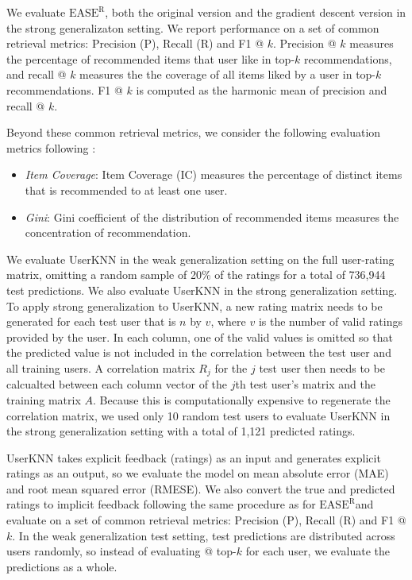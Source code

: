 \documentclass{article}
\newcommand{\easer}{$\text{EASE}^\text{R}$}
\newcommand{\userknn}{UserKNN\xspace}
\begin{document}
  We evaluate \easer, both the original version and the gradient descent version
 in the strong generalizaton setting.
We report performance on a set of common retrieval metrics: Precision (P), Recall
 (R) and F1 @ $k$.
Precision @ $k$ measures the percentage of recommended items that user like in
 top-$k$ recommendations, and recall @ $k$ measures the the coverage of all
 items liked by a user in top-$k$ recommendations.
F1 @ $k$ is computed as the harmonic mean of precision and recall @ $k$.

Beyond these common retrieval metrics, we consider the following evaluation
 metrics following \citet{anelliTopNRecommendationAlgorithms2022}:
 \begin{itemize} \item {\em Item Coverage}: Item Coverage (IC) measures the
 percentage of distinct items that is recommended to at least one user.
\item {\em Gini}: Gini coefficient of the distribution of recommended items
measures the concentration of recommendation.

\end{itemize}

We evaluate \userknn in the weak generalization setting on the full user-rating matrix, 
omitting a random sample of 20\% of the ratings for a total of 736,944 test predictions.  
We also evaluate \userknn in the strong generalization setting. To apply strong 
generalization to \userknn, a new rating matrix needs to be generated for each test user that is $n$ by $v$, where $v$ is 
the number of valid ratings provided by the user. In each column, one of the valid values 
 is omitted so that the predicted value is not included in the correlation between
the test user and all training users. A correlation matrix $R_j$ for the $j$ test user
 then needs to be
calcualted between each column vector of the $j$th test user's matrix and the training matrix
$A$. Because this is computationally expensive to regenerate the correlation matrix, we 
 used only 10 random test users to
 evaluate \userknn in the strong generalization setting with a total of 1,121 predicted
 ratings.  

\userknn takes explicit feedback (ratings) as an input and generates explicit ratings as an output,
so we evaluate the model on mean absolute error (MAE) and root mean squared error (RMESE).
We also convert the true and predicted ratings to implicit feedback following the same
procedure as for \easer and evaluate on a set of common retrieval metrics: Precision (P), 
Recall (R) and F1 @ $k$. In the weak generalization test setting, test predictions are 
distributed across users randomly, so instead of evaluating @ top-$k$ for each user, we evaluate
the predictions as a whole. 
\end{document}
